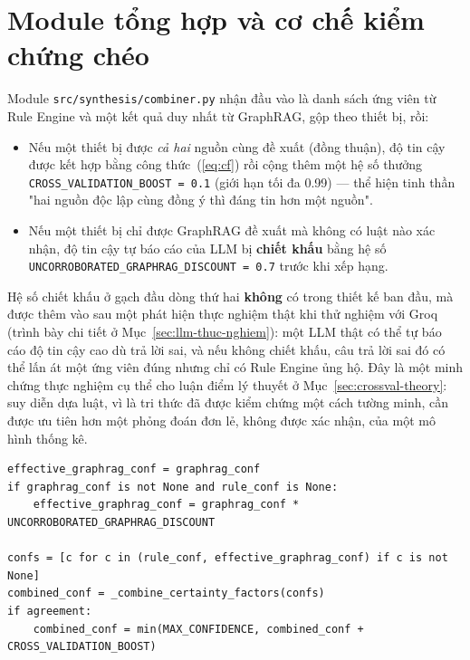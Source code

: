 \documentclass[12pt,a4paper]{report}
\newcommand{\code}[1]{\texttt{\small #1}}
\begin{document}
\section{Module tổng hợp và cơ chế kiểm chứng chéo}
\label{sec:combiner}

Module \code{src/synthesis/combiner.py} nhận đầu vào là danh sách ứng viên từ Rule Engine và một
kết quả duy nhất từ GraphRAG, gộp theo thiết bị, rồi:

\begin{itemize}
    \item Nếu một thiết bị được \emph{cả hai} nguồn cùng đề xuất (đồng thuận), độ tin cậy được kết
    hợp bằng công thức~(\ref{eq:cf}) rồi cộng thêm một hệ số thưởng
    \code{CROSS\_VALIDATION\_BOOST = 0.1} (giới hạn tối đa 0.99) --- thể hiện tinh thần "hai nguồn
    độc lập cùng đồng ý thì đáng tin hơn một nguồn".
    \item Nếu một thiết bị chỉ được GraphRAG đề xuất mà không có luật nào xác nhận, độ tin cậy tự
    báo cáo của LLM bị \textbf{chiết khấu} bằng hệ số
    \code{UNCORROBORATED\_GRAPHRAG\_DISCOUNT = 0.7} trước khi xếp hạng.
\end{itemize}

Hệ số chiết khấu ở gạch đầu dòng thứ hai \textbf{không} có trong thiết kế ban đầu, mà được thêm vào
sau một phát hiện thực nghiệm thật khi thử nghiệm với Groq (trình bày chi tiết ở
Mục~\ref{sec:llm-thuc-nghiem}): một LLM thật có thể tự báo cáo độ tin cậy cao dù trả lời sai, và
nếu không chiết khấu, câu trả lời sai đó có thể lấn át một ứng viên đúng nhưng chỉ có Rule Engine
ủng hộ. Đây là một minh chứng thực nghiệm cụ thể cho luận điểm lý thuyết ở
Mục~\ref{sec:crossval-theory}: suy diễn dựa luật, vì là tri thức đã được kiểm chứng một cách tường
minh, cần được ưu tiên hơn một phỏng đoán đơn lẻ, không được xác nhận, của một mô hình thống kê.

\begin{lstlisting}[style=py,caption={Chiết khấu ứng viên GraphRAG không được luật nào xác nhận (\texttt{src/synthesis/combiner.py})},label=lst:discount]
effective_graphrag_conf = graphrag_conf
if graphrag_conf is not None and rule_conf is None:
    effective_graphrag_conf = graphrag_conf * UNCORROBORATED_GRAPHRAG_DISCOUNT

confs = [c for c in (rule_conf, effective_graphrag_conf) if c is not None]
combined_conf = _combine_certainty_factors(confs)
if agreement:
    combined_conf = min(MAX_CONFIDENCE, combined_conf + CROSS_VALIDATION_BOOST)
\end{lstlisting}
\end{document}
